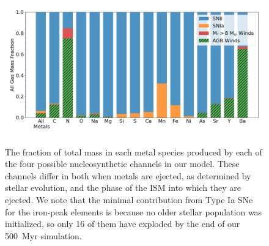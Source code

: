 \begin{figure}
\centering
\includegraphics[width=0.95\linewidth]{figures/ch3/species_bar_sources}\\
\caption{The fraction of total mass in each metal species produced by each of the four possible nucleosynthetic channels in our model. These channels differ in both when metals are ejected, as determined by stellar evolution, and the phase of the ISM into which they are ejected.
We note that the minimal contribution from Type Ia SNe for the iron-peak elements is because  no older stellar population was initialized, so only 16 of them have exploded by the end of our 500~Myr simulation.}

\label{ch3:fig:species_sources}
\end{figure}

